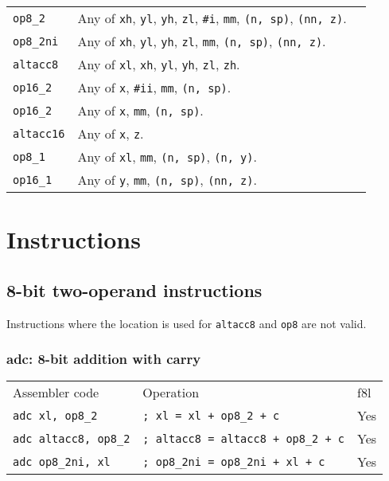 \documentclass{book}
\begin{document}
\begin{tabular}{l l l}
\texttt{op8\_2} & Any of \texttt{xh}, \texttt{yl}, \texttt{yh}, \texttt{zl}, \texttt{\#i}, \texttt{mm}, \texttt{(n, sp)}, \texttt{(nn, z)}. \\
\texttt{op8\_2ni} & Any of \texttt{xh}, \texttt{yl}, \texttt{yh}, \texttt{zl}, \texttt{mm}, \texttt{(n, sp)}, \texttt{(nn, z)}. \\
\texttt{altacc8} & Any of \texttt{xl}, \texttt{xh}, \texttt{yl}, \texttt{yh}, \texttt{zl}, \texttt{zh}. \\
\texttt{op16\_2} & Any of \texttt{x}, \texttt{\#ii}, \texttt{mm}, \texttt{(n, sp)}. \\
\texttt{op16\_2} & Any of \texttt{x}, \texttt{mm}, \texttt{(n, sp)}. \\
\texttt{altacc16} & Any of \texttt{x}, \texttt{z}. \\
\texttt{op8\_1} & Any of \texttt{xl}, \texttt{mm}, \texttt{(n, sp)}, \texttt{(n, y)}. \\
\texttt{op16\_1} & Any of \texttt{y}, \texttt{mm}, \texttt{(n, sp)}, \texttt{(nn, z)}. \\
\end{tabular}

\chapter{Instructions}

\section{8-bit two-operand instructions}

Instructions where the location is used for \texttt{altacc8} and \texttt{op8} are not valid.

\subsection{adc: 8-bit addition with carry}

\begin{tabular}{l l l}
Assembler code            & Operation                                    & f8l \\
\texttt{adc xl, op8\_2}      & \texttt{; xl = xl + op8\_2 + c}           & Yes \\
\texttt{adc altacc8, op8\_2} & \texttt{; altacc8 = altacc8 + op8\_2 + c} & Yes \\
\texttt{adc op8\_2ni, xl}    & \texttt{; op8\_2ni = op8\_2ni + xl + c}   & Yes
\end{tabular}
\end{document}
